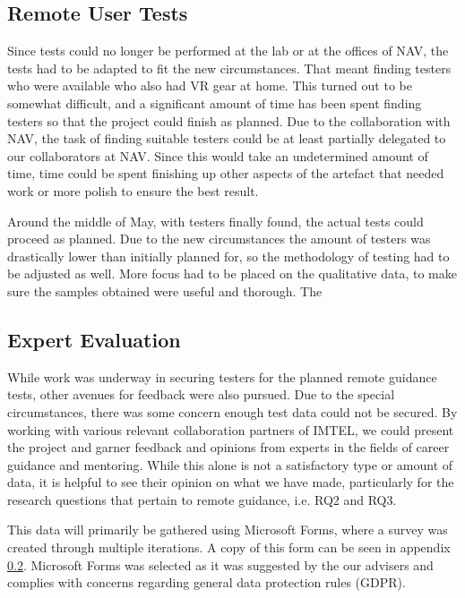 \subsection{Remote User Tests}
Since tests could no longer be performed at the lab or at the offices of NAV, the tests had to be adapted to fit the new circumstances. That meant finding testers who were available who also had VR gear at home. This turned out to be somewhat difficult, and a significant amount of time has been spent finding testers so that the project could finish as planned. Due to the collaboration with NAV, the task of finding suitable testers could be at least partially delegated to our collaborators at NAV. Since this would take an undetermined amount of time, time could be spent finishing up other aspects of the artefact that needed work or more polish to ensure the best result.

Around the middle of May, with testers finally found, the actual tests could proceed as planned. Due to the new circumstances the amount of testers was drastically lower than initially planned for, so the methodology of testing had to be adjusted as well. More focus had to be placed on the qualitative data, to make sure the samples obtained were useful and thorough. The 



\subsection{Expert Evaluation}
While work was underway in securing testers for the planned remote guidance tests, other avenues for feedback were also pursued. Due to the special circumstances, there was some concern enough test data could not be secured. By working with various relevant collaboration partners of IMTEL, we could present the project and garner feedback and opinions from experts in the fields of career guidance and mentoring. While this alone is not a satisfactory type or amount of data, it is helpful to see their opinion on what we have made, particularly for the research questions that pertain to remote guidance, i.e. RQ2 and RQ3.

This data will primarily be gathered using Microsoft Forms, where a survey was created through multiple iterations. A copy of this form can be seen in appendix \ref{}. Microsoft Forms was selected as it was suggested by the our advisers and complies with concerns regarding general data protection rules (GDPR).

